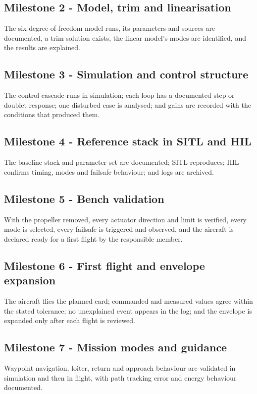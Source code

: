 \documentclass[11pt,a4paper]{article}
\begin{document}
\subsection{Milestone 2 - Model, trim and linearisation}
The six-degree-of-freedom model runs, its parameters and sources are
documented, a trim solution exists, the linear model's modes are identified,
and the results are explained.

\subsection{Milestone 3 - Simulation and control structure}
The control cascade runs in simulation; each loop has a documented step or
doublet response; one disturbed case is analysed; and gains are recorded with
the conditions that produced them.

\subsection{Milestone 4 - Reference stack in SITL and HIL}
The baseline stack and parameter set are documented; SITL reproduces; HIL
confirms timing, modes and failsafe behaviour; and logs are archived.

\subsection{Milestone 5 - Bench validation}
With the propeller removed, every actuator direction and limit is verified,
every mode is selected, every failsafe is triggered and observed, and the
aircraft is declared ready for a first flight by the responsible member.

\subsection{Milestone 6 - First flight and envelope expansion}
The aircraft flies the planned card; commanded and measured values agree within
the stated tolerance; no unexplained event appears in the log; and the envelope
is expanded only after each flight is reviewed.

\subsection{Milestone 7 - Mission modes and guidance}
Waypoint navigation, loiter, return and approach behaviour are validated in
simulation and then in flight, with path tracking error and energy behaviour
documented.
\end{document}
